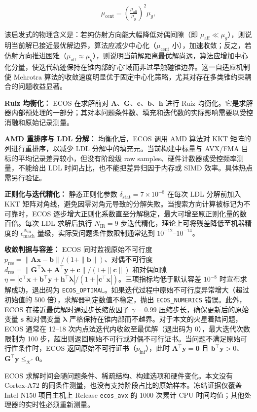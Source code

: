 \begin{align}
\mu_{\text{cent}} = \left(\frac{\mu_{\text{aff}}}{\mu_g}\right)^2 \mu_g,
\end{align}

该启发式的物理含义是：若纯仿射方向能大幅降低对偶间隙（即 $\mu_{\text{aff}} \ll \mu_g$），则说明当前解已接近最优解边界，算法应减少中心化（$\mu_{\text{cent}}$ 小），加速收敛；反之，若仿射方向推进困难（$\mu_{\text{aff}} \approx \mu_g$），则说明当前解距离最优解尚远，算法应增加中心化分量，使迭代轨迹保持在锥内部的\"中心\"区域而非过早触碰锥边界。这一自适应机制使 Mehrotra 算法的收敛速度明显优于固定中心化策略，尤其对存在多类锥约束耦合的问题收益显著。

\textbf{Ruiz 均衡化：} ECOS 在求解前对 $\bm{A}$、$\bm{G}$、$\bm{c}$、$\bm{b}$、$\bm{h}$ 进行 Ruiz 均衡化。它是求解器内部预处理的一部分；其对本问题条件数、填充和迭代数的实际影响需要以受控消融和原始记录测量。

\textbf{AMD 重排序与 LDL 分解：} 均衡化后，ECOS 调用 AMD 算法对 KKT 矩阵的列进行重排序，以减少 LDL 分解中的填充元。当前构建中标量与 AVX/FMA 目标的平均记录差异较小，但没有阶段级 raw samples、硬件计数器或受控频率测量，不能给出 LDL 时间占比，也不能把差异归因于内存或 SIMD 效率。具体热点需另行验证。

\textbf{正则化与迭代精化：} 静态正则化参数 $\delta_{\text{stat}} = 7\times 10^{-8}$ 在每次 LDL 分解前加入 KKT 矩阵对角线，避免因零对角元导致的分解失败。当搜索方向计算被标记为不可靠时，ECOS 逐步增大正则化系数直至分解稳定，最大可增至原正则化量的数百倍。每次 LDL 求解后执行 $N_{\text{IR}} = 9$ 步迭代精化，理论上可将残差降低至机器精度的 $\epsilon_{\text{mach}}^{N_{\text{IR}}}$ 量级，实际受问题条件数限制通常达到 $10^{-12}$--$10^{-14}$。

\textbf{收敛判据与容差：} ECOS 同时监视原始不可行度 $p_{\text{res}} = \|\bm{A}\bm{x} - \bm{b}\| / (1 + \|\bm{b}\|)$、对偶不可行度 $d_{\text{res}} = \|\bm{G}^{\top}\bm{\lambda} + \bm{A}^{\top}\bm{y} + \bm{c}\| / (1 + \|\bm{c}\|)$ 和对偶间隙 $\eta = |\bm{c}^{\top}\bm{x} + \bm{b}^{\top}\bm{y} + \bm{h}^{\top}\bm{\lambda}| / (1 + |\bm{c}^{\top}\bm{x}|)$。三项指标均低于默认容差 $10^{-8}$ 时宣布求解成功，退出码为 \lstinline{ECOS_OPTIMAL}。如果迭代过程中原始不可行度异常增大（超过初始值的 500 倍），求解器判定数值不稳定，抛出 \lstinline{ECOS_NUMERICS} 错误。此外，ECOS 在接近最优解时通过步长缩放因子 $\gamma = 0.99$ 压缩步长，确保更新后的原始变量 $\bm{s}$ 和对偶变量 $\bm{\lambda}$ 严格保持在锥内部而不越界。对于本文的火星着陆问题，ECOS 通常在 12--18 次内点法迭代内收敛至最优解（退出码为 0），最大迭代次数限制为 100 步，超出则返回原始不可行或对偶不可行证书。当问题不满足原始可行性条件时，ECOS 返回原始不可行证书（$p_{\text{inf}}$），此时 $\bm{A}^{\top}\bm{y} = \bm{0}$ 且 $\bm{b}^{\top}\bm{y} > 0$、$\bm{G}^{\top}\bm{y} \leq_{\mathcal{K}^*} \bm{0}$。

ECOS 求解时间会随问题条件、稀疏结构、构建选项和硬件变化。本文没有 Cortex-A72 的同条件测量，也没有支持阶段占比的原始样本。冻结证据仅覆盖 Intel N150 项目主机上 Release \texttt{ecos\_avx} 的 1000 次累计 CPU 时间均值；其他处理器的实时性必须重新测量。
